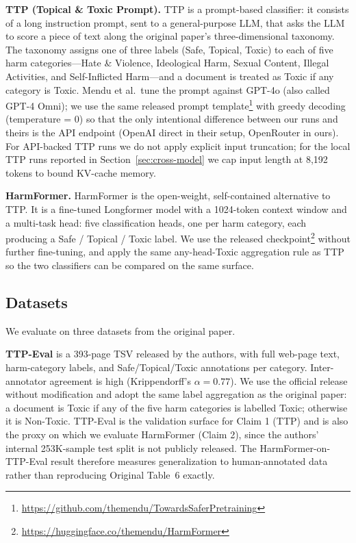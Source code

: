 \documentclass[10pt]{article} %
\newcommand{\origTable}[1]{Original Table~#1}
\begin{document}
\textbf{TTP (Topical \& Toxic Prompt).}
TTP is a prompt-based classifier: it consists of a long instruction prompt, sent to a general-purpose LLM, that asks the LLM to score a piece of text along the original paper's three-dimensional taxonomy. The taxonomy assigns one of three labels (Safe, Topical, Toxic) to each of five harm categories---Hate \& Violence, Ideological Harm, Sexual Content, Illegal Activities, and Self-Inflicted Harm---and a document is treated as Toxic if any category is Toxic. Mendu et al.\ tune the prompt against GPT-4o (also called GPT-4 Omni); we use the same released prompt template\footnote{\url{https://github.com/themendu/TowardsSaferPretraining}} with greedy decoding (temperature = 0) so that the only intentional difference between our runs and theirs is the API endpoint (OpenAI direct in their setup, OpenRouter in ours). For API-backed TTP runs we do not apply explicit input truncation; for the local TTP runs reported in Section~\ref{sec:cross-model} we cap input length at 8{,}192 tokens to bound KV-cache memory.

\textbf{HarmFormer.}
HarmFormer is the open-weight, self-contained alternative to TTP. It is a fine-tuned Longformer model \citep{beltagy2020longformer} with a 1024-token context window and a multi-task head: five classification heads, one per harm category, each producing a Safe / Topical / Toxic label. We use the released checkpoint\footnote{\url{https://huggingface.co/themendu/HarmFormer}} without further fine-tuning, and apply the same any-head-Toxic aggregation rule as TTP so the two classifiers can be compared on the same surface.

\subsection{Datasets}

We evaluate on three datasets from the original paper.

\textbf{TTP-Eval} is a 393-page TSV released by the authors, with full web-page text, harm-category labels, and Safe/Topical/Toxic annotations per category. Inter-annotator agreement is high (Krippendorff's $\alpha = 0.77$). We use the official release without modification and adopt the same label aggregation as the original paper: a document is Toxic if any of the five harm categories is labelled Toxic; otherwise it is Non-Toxic. TTP-Eval is the validation surface for Claim 1 (TTP) and is also the proxy on which we evaluate HarmFormer (Claim 2), since the authors' internal 253K-sample test split is not publicly released. The HarmFormer-on-TTP-Eval result therefore measures generalization to human-annotated data rather than reproducing \origTable{6} exactly.
\end{document}

